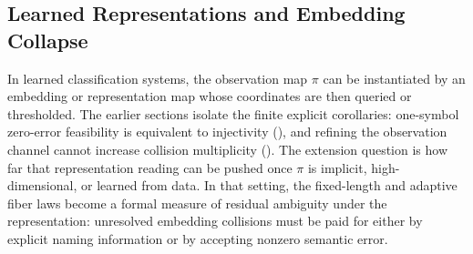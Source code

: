 \subsection{Learned Representations and Embedding Collapse}

In learned classification systems, the observation map $\pi$ can be instantiated by an embedding or representation map whose coordinates are then queried or thresholded. The earlier sections isolate the finite explicit corollaries: one-symbol zero-error feasibility is equivalent to injectivity (), and refining the observation channel cannot increase collision multiplicity (). The extension question is how far that representation reading can be pushed once $\pi$ is implicit, high-dimensional, or learned from data. In that setting, the fixed-length and adaptive fiber laws become a formal measure of residual ambiguity under the representation: unresolved embedding collisions must be paid for either by explicit naming information or by accepting nonzero semantic error.


